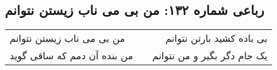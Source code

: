 \begin{center}
\section*{رباعی شماره ۱۳۲: من بی می ناب زیستن نتوانم}
\label{sec:sh132}
\begin{longtable}{l p{0.5cm} r}
من بی می ناب زیستن نتوانم
&&
بی باده کشید بارتن نتوانم
\\
من بنده آن دمم که ساقی گوید
&&
یک جام دگر بگیر و من نتوانم
\\
\end{longtable}
\end{center}
